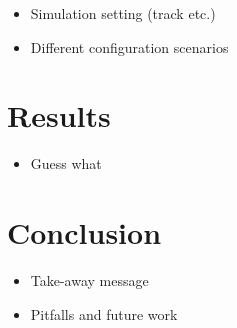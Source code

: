 \documentclass[a4paper, twocolumn, 11pt, twoside]{article}
\begin{document}
\begin{itemize}
    \item Simulation setting (track etc.)
    \item Different configuration scenarios
\end{itemize}

\section*{Results}

\begin{itemize}
    \item Guess what
\end{itemize}

\section*{Conclusion}

\begin{itemize}
    \item Take-away message
    \item Pitfalls and future work
\end{itemize}




\end{document}
